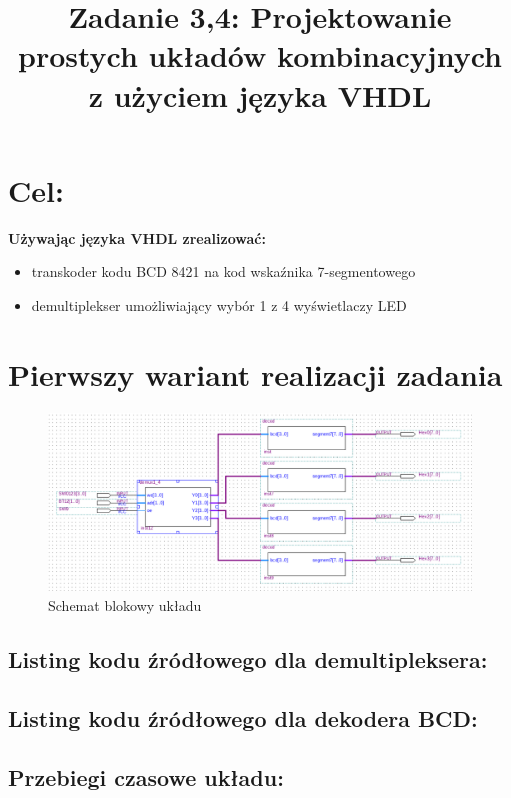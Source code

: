 \documentclass{classrep}
\author{
  \studentinfo{Witold Olechowski}{127517} \and
  \studentinfo{Tomasz Marecik}{127374}
}
\title{Zadanie 3,4: Projektowanie prostych układów kombinacyjnych z użyciem języka VHDL }
\begin{document}
\maketitle

\section{Cel:}
\textbf{Używając języka VHDL zrealizować:}
\begin{itemize}
	\item transkoder kodu BCD 8421 na kod wskaźnika 7-segmentowego
	\item demultiplekser umożliwiający wybór 1 z 4 wyświetlaczy LED
\end{itemize}

\section{Pierwszy wariant realizacji zadania}

\begin{figure}[H]
	\centering
	\includegraphics[width=1.0\linewidth]{block_bcd_segment}
	\caption{Schemat blokowy układu}
	\label{fig:block_bcd_segment}
\end{figure}

\subsection{Listing kodu źródłowego dla demultipleksera:}
	

\subsection{Listing kodu źródłowego dla dekodera BCD:}
	

\subsection{Przebiegi czasowe układu:}
\end{document}
